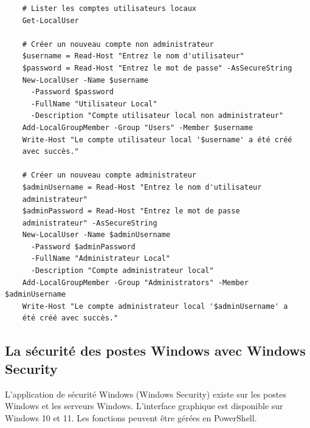\begin{center}
  \begin{verbatim}
    # Lister les comptes utilisateurs locaux
    Get-LocalUser

    # Créer un nouveau compte non administrateur
    $username = Read-Host "Entrez le nom d'utilisateur"
    $password = Read-Host "Entrez le mot de passe" -AsSecureString
    New-LocalUser -Name $username 
      -Password $password 
      -FullName "Utilisateur Local" 
      -Description "Compte utilisateur local non administrateur"
    Add-LocalGroupMember -Group "Users" -Member $username
    Write-Host "Le compte utilisateur local '$username' a été créé 
    avec succès."

    # Créer un nouveau compte administrateur
    $adminUsername = Read-Host "Entrez le nom d'utilisateur
    administrateur"
    $adminPassword = Read-Host "Entrez le mot de passe 
    administrateur" -AsSecureString
    New-LocalUser -Name $adminUsername 
      -Password $adminPassword 
      -FullName "Administrateur Local" 
      -Description "Compte administrateur local"
    Add-LocalGroupMember -Group "Administrators" -Member $adminUsername
    Write-Host "Le compte administrateur local '$adminUsername' a 
    été créé avec succès."
  \end{verbatim}
\end{center}

\newpage

\subsection*{La sécurité des postes Windows avec Windows Security}
{}

\noindent L'application de sécurité Windows (Windows Security) existe sur les postes Windows et les serveurs Windows. L'interface graphique est disponible sur Windows 10 et 11. Les fonctions peuvent être gérées en PowerShell.

